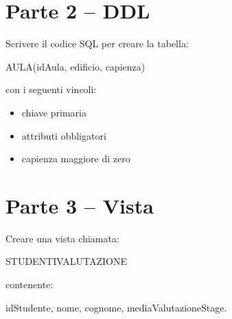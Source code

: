 \documentclass[a4paper,11pt]{article}
\begin{document}
	\section*{Parte 2 – DDL}
	
	Scrivere il codice SQL per creare la tabella:
	
	AULA(idAula, edificio, capienza)
	
	con i seguenti vincoli:
	
	\begin{itemize}
		\item chiave primaria
		\item attributi obbligatori
		\item capienza maggiore di zero
	\end{itemize}
	
	\section*{Parte 3 – Vista}
	
	Creare una vista chiamata:
	
	STUDENTIVALUTAZIONE
	
	contenente:
	
	idStudente, nome, cognome, mediaValutazioneStage.
	
\end{document}

